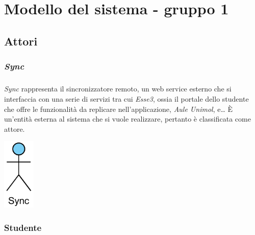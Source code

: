 
\chapter{Modello del sistema - gruppo 1}
\label{ref:modSistemaGruppo1}






\section{Attori}
\subsection{\textit{Sync}}
\paragraph{} 
\textit{Sync} rappresenta il sincronizzatore remoto, un web service esterno che si interfaccia con una serie di servizi tra cui \textit{Esse3}, ossia il portale dello studente che offre le funzionalità da replicare nell’applicazione, \textit{Aule Unimol}, e… È un’entità esterna al sistema che si vuole realizzare, pertanto  è classificata come attore.
\begin{center}
	\includegraphics[width=0.6in]{imgs/gruppo1/Attore-Sync.pdf}
\end{center}

\subsection{Studente}
